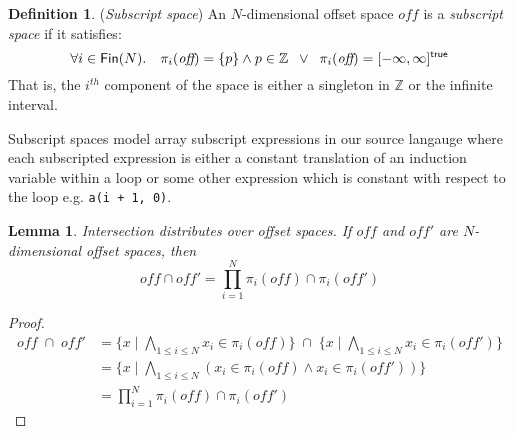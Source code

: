 \documentclass[acmlarge,review]{acmart}
\theoremstyle{definition}
\newtheorem{defn}{Definition}
\theoremstyle{plain}
\newtheorem{lem}{Lemma}
\theoremstyle{remark}
\begin{document}
%

\begin{defn}{(\emph{Subscript space})}
  An $N$-dimensional offset space $\textit{off}$ is a \emph{subscript space} if it
  satisfies:
%
\begin{equation*}
\forall i \in \textsf{Fin}(N) . \quad 
\pi_i (\textit{off}) = \{p\} \wedge p \in \mathbb{Z} 
\;\;
\vee
\;\;
\pi_i (\textit{off}) = \textnormal{$\lbrack-\infty,\infty\rbrack^{\mathsf{true}}$}
\end{equation*}
%
That is, the $i^{th}$ component of the space is either a singleton 
in $\mathbb{Z}$ or the infinite interval.

Subscript spaces model array subscript expressions in our source
langauge where each subscripted expression is either a 
constant translation of an induction variable within a loop or some
other expression which is constant with respect to the loop e.g. \texttt{a(i + 1, 0)}.
\end{defn}


\begin{lem}{}\label{lem:vector-intersect}
  Intersection distributes over offset spaces. If $\mathit{off}$ and
  $\mathit{off'}$ are $N$-dimensional offset spaces, then
%
  \begin{equation*}
    \mathit{off} \cap \mathit{off'} =
      \prod_{i = 1}^{N} \pi_i(\mathit{off}) \cap \pi_i(\mathit{off'})
  \end{equation*}
\end{lem}
%
\begin{proof}
  \begin{align*}
    \mathit{off} \; \cap \; \mathit{off'} &
    = \{x \mid \bigwedge_{1 \leq i \leq N } x_i \in \pi_i(\mathit{off}) \}
      \;\cap\;
      \{x \mid \bigwedge_{1 \leq i \leq N } x_i \in \pi_i(\mathit{off'}) \} \\
    & = \{x \mid \bigwedge_{1 \leq i \leq N }
      (x_i \in \pi_i(\mathit{off}) \wedge x_i \in \pi_i(\mathit{off'})) \} \\
    & = \prod_{i = 1}^{N} \pi_i(\mathit{off}) \cap \pi_i(\mathit{off'})
  \end{align*}
\end{proof}
\end{document}
